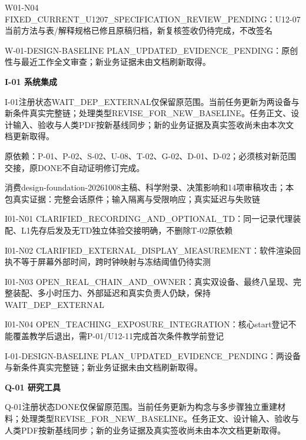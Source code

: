 \documentclass[11pt,a4paper]{article}
\newcommand{\reviewsection}[1]{\par\Needspace{5\baselineskip}\vspace{10pt}\begin{center}{\titlelatin\titlecjk\bfseries\fontsize{14}{20}\selectfont #1}\end{center}}
\begin{document}
W01-\allowbreak{}N04 FIXED\_\allowbreak{}CURRENT\_\allowbreak{}U1207\_\allowbreak{}SPECIFICATION\_\allowbreak{}REVIEW\_\allowbreak{}PENDING：U12-\allowbreak{}07当前方法与表/\allowbreak{}解释规格已修且原稿归档，新复核签收仍待完成，不改签名


W-\allowbreak{}01-\allowbreak{}DESIGN-\allowbreak{}BASELINE PLAN\_\allowbreak{}UPDATED\_\allowbreak{}EVIDENCE\_\allowbreak{}PENDING：原创性与最近工作全文审查；新业务证据未由文档刷新取得。


\reviewsection{I-\allowbreak{}01 系统集成}
I-\allowbreak{}01注册状态WAIT\_\allowbreak{}DEP\_\allowbreak{}EXTERNAL仅保留原范围。当前任务更新为两设备与新条件真实完整链；处理类型REVISE\_\allowbreak{}FOR\_\allowbreak{}NEW\_\allowbreak{}BASELINE。任务正文、设计输入、验收与人类PDF按新基线同步；新的业务证据及真实签收尚未由本次文档更新取得。


原依赖：P-\allowbreak{}01、P-\allowbreak{}02、S-\allowbreak{}02、U-\allowbreak{}08、T-\allowbreak{}02、G-\allowbreak{}02、D-\allowbreak{}01、D-\allowbreak{}02；必须核对新范围交接，原DONE不自动证明修订完成。


消费design-\allowbreak{}foundation-\allowbreak{}20261008主稿、科学附录、决策影响和14项审稿攻击；本包真实证据：完整会话原件；输入隔离与受限响应；真实延迟与失败链


I01-\allowbreak{}N01 CLARIFIED\_\allowbreak{}RECORDING\_\allowbreak{}AND\_\allowbreak{}OPTIONAL\_\allowbreak{}TD：同一记录代理装配、L1先存后发及无TD独立体验交接明确，不删除T-\allowbreak{}02原依赖


I01-\allowbreak{}N02 CLARIFIED\_\allowbreak{}EXTERNAL\_\allowbreak{}DISPLAY\_\allowbreak{}MEASUREMENT：软件渲染回执不等于屏幕外部时间，跨时钟映射与冻结阈值仍待实测


I01-\allowbreak{}N03 OPEN\_\allowbreak{}REAL\_\allowbreak{}CHAIN\_\allowbreak{}AND\_\allowbreak{}OWNER：真实双设备、最终八呈现、完整装配、多小时压力、外部延迟和真实负责人仍缺，保持WAIT\_\allowbreak{}DEP\_\allowbreak{}EXTERNAL


I01-\allowbreak{}N04 OPEN\_\allowbreak{}TEACHING\_\allowbreak{}EXPOSURE\_\allowbreak{}INTEGRATION：核心start登记不能覆盖教学后退出，需P-\allowbreak{}01/\allowbreak{}U12-\allowbreak{}11完成首次条件教学前登记


I-\allowbreak{}01-\allowbreak{}DESIGN-\allowbreak{}BASELINE PLAN\_\allowbreak{}UPDATED\_\allowbreak{}EVIDENCE\_\allowbreak{}PENDING：两设备与新条件真实完整链；新业务证据未由文档刷新取得。


\reviewsection{Q-\allowbreak{}01 研究工具}
Q-\allowbreak{}01注册状态DONE仅保留原范围。当前任务更新为构念与多步骤独立重建材料；处理类型REVISE\_\allowbreak{}FOR\_\allowbreak{}NEW\_\allowbreak{}BASELINE。任务正文、设计输入、验收与人类PDF按新基线同步；新的业务证据及真实签收尚未由本次文档更新取得。
\end{document}
